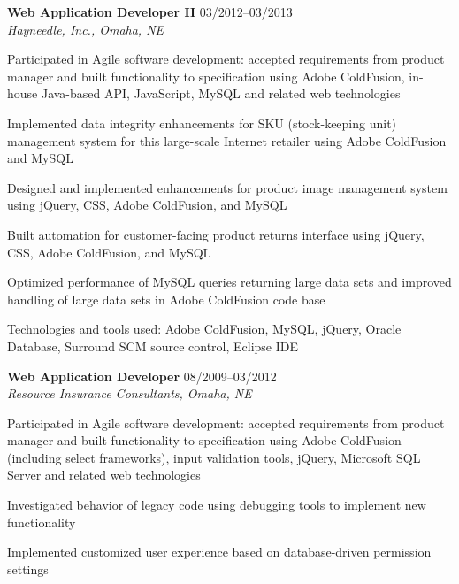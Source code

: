 \begin{itemize1}
	\item \textbf{Web Application Developer II} \textopenbullet{} 03/2012--03/2013 \\
		\textit{Hayneedle, Inc., Omaha, NE} \vspace{-1.5mm}
		\begin{itemize1}
			\item Participated in Agile software development: accepted requirements from product manager and built functionality to specification using Adobe ColdFusion, in-house Java-based API, JavaScript, MySQL and related web technologies
			\item Implemented data integrity enhancements for SKU (stock-keeping unit) management system for this large-scale Internet retailer using Adobe ColdFusion and MySQL
			\item Designed and implemented enhancements for product image management system using jQuery, CSS, Adobe ColdFusion, and MySQL
			\item Built automation for customer-facing product returns interface using jQuery, CSS, Adobe ColdFusion, and MySQL
			\item Optimized performance of MySQL queries returning large data sets and improved handling of large data sets in Adobe ColdFusion code base
			\item Technologies and tools used: Adobe ColdFusion, MySQL, jQuery, Oracle Database, Surround SCM source control, Eclipse IDE
		\end{itemize1}
	\item \textbf{Web Application Developer} \textopenbullet{} 08/2009--03/2012 \\
		\textit{Resource Insurance Consultants, Omaha, NE} \vspace{-1.5mm}
		\begin{itemize1}
 			\item Participated in Agile software development: accepted requirements from product manager and built functionality to specification using Adobe ColdFusion (including select frameworks), input validation tools, jQuery, Microsoft SQL Server and related web technologies
 			\item Investigated behavior of legacy code using debugging tools to implement new functionality	
			\item Implemented customized user experience based on database-driven permission settings

\end{itemize1}
\end{itemize1}
